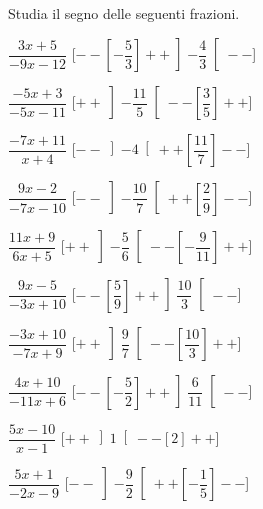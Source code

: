 \begin{esercizio}\label{ese:dis_8}
 Studia il segno delle seguenti frazioni.
\begin{multicols}{2}
 \begin{enumeratea}
  \item  $\dfrac{3 x +5}{-9 x -12}$ \hfill 
  [$--\left [-\dfrac{5}{3} \right ]++\left ]-\dfrac{4}{3} \right [--$]
  \item  $\dfrac{-5 x +3}{-5 x -11}$ \hfill 
  [$++\left ]-\dfrac{11}{5} \right [--\left [\dfrac{3}{5} \right ]++$]
  \item  $\dfrac{-7 x +11}{x +4}$ \hfill 
  [$--\left ]-4 \right [++\left [\dfrac{11}{7} \right ]--$]
  \item  $\dfrac{9 x -2}{-7 x -10}$ \hfill 
  [$--\left ]-\dfrac{10}{7} \right [++\left [\dfrac{2}{9} \right ]--$]
  \item  $\dfrac{11 x +9}{6 x +5}$ \hfill 
  [$++\left ]-\dfrac{5}{6} \right [--\left [-\dfrac{9}{11} \right ]++$]
  \item  $\dfrac{9 x -5}{-3 x +10}$ \hfill 
  [$--\left [\dfrac{5}{9} \right ]++\left ]\dfrac{10}{3} \right [--$]
  \item  $\dfrac{-3 x +10}{-7 x +9}$ \hfill 
  [$++\left ]\dfrac{9}{7} \right [--\left [\dfrac{10}{3} \right ]++$]
  \item  $\dfrac{4 x +10}{-11 x +6}$ \hfill 
  [$--\left [-\dfrac{5}{2} \right ]++\left ]\dfrac{6}{11} \right [--$]
  \item  $\dfrac{5 x -10}{x -1}$ \hfill 
  [$++\left ]1 \right [--\left [2 \right ]++$]
  \item  $\dfrac{5 x +1}{-2 x -9}$ \hfill 
  [$--\left ]-\dfrac{9}{2} \right [++\left [-\dfrac{1}{5} \right ]--$]
 \end{enumeratea}
\end{multicols}
\end{esercizio}

\subsubsection*{}

